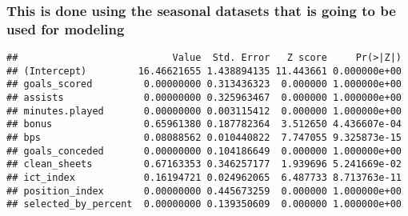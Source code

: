 \documentclass[]{article}
\newenvironment{Shaded}{\begin{snugshade}}{\end{snugshade}}
\newcommand{\DataTypeTok}[1]{\textcolor[rgb]{0.13,0.29,0.53}{#1}}
\newcommand{\DecValTok}[1]{\textcolor[rgb]{0.00,0.00,0.81}{#1}}
\newcommand{\KeywordTok}[1]{\textcolor[rgb]{0.13,0.29,0.53}{\textbf{#1}}}
\newcommand{\NormalTok}[1]{#1}
\newcommand{\OperatorTok}[1]{\textcolor[rgb]{0.81,0.36,0.00}{\textbf{#1}}}
\newcommand{\StringTok}[1]{\textcolor[rgb]{0.31,0.60,0.02}{#1}}
\begin{document}
\hypertarget{this-is-done-using-the-seasonal-datasets-that-is-going-to-be-used-for-modeling}{%
\subsubsection{This is done using the seasonal datasets that is going to
be used for
modeling}\label{this-is-done-using-the-seasonal-datasets-that-is-going-to-be-used-for-modeling}}

\begin{Shaded}
\end{Shaded}

\begin{verbatim}
##                           Value  Std. Error   Z score     Pr(>|Z|)
## (Intercept)         16.46621655 1.438894135 11.443661 0.000000e+00
## goals_scored         0.00000000 0.313436323  0.000000 1.000000e+00
## assists              0.00000000 0.325963467  0.000000 1.000000e+00
## minutes.played       0.00000000 0.003115412  0.000000 1.000000e+00
## bonus                0.65961380 0.187782364  3.512650 4.436607e-04
## bps                  0.08088562 0.010440822  7.747055 9.325873e-15
## goals_conceded       0.00000000 0.104186649  0.000000 1.000000e+00
## clean_sheets         0.67163353 0.346257177  1.939696 5.241669e-02
## ict_index            0.16194721 0.024962065  6.487733 8.713763e-11
## position_index       0.00000000 0.445673259  0.000000 1.000000e+00
## selected_by_percent  0.00000000 0.139350609  0.000000 1.000000e+00
\end{verbatim}

\begin{Shaded}
\end{Shaded}
\end{document}

